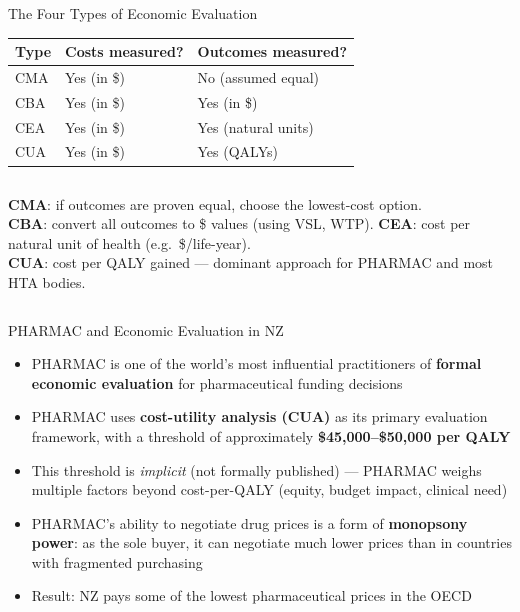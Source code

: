 \documentclass[aspectratio=169, 12pt]{beamer}
\begin{document}
\begin{frame}{The Four Types of Economic Evaluation}
  \begin{center}
    \small
    \begin{tabular}{@{}lll@{}}
      \toprule
      \textbf{Type} & \textbf{Costs measured?} & \textbf{Outcomes measured?} \\
      \midrule
      CMA & Yes (in \$) & No (assumed equal) \\
      CBA & Yes (in \$) & Yes (in \$) \\
      CEA & Yes (in \$) & Yes (natural units) \\
      CUA & Yes (in \$) & Yes (QALYs) \\
      \bottomrule
    \end{tabular}
  \end{center}
  \vspace{0.5em}
  \begin{columns}
      \small
      \textbf{CMA}: if outcomes are proven equal, choose the lowest-cost option.\\[0.4em]
      \textbf{CBA}: convert all outcomes to \$ values (using VSL, WTP).
      \small
      \textbf{CEA}: cost per natural unit of health (e.g.\ \$/life-year).\\[0.4em]
      \textbf{CUA}: cost per QALY gained --- dominant approach for PHARMAC and most HTA bodies.
  \end{columns}
\end{frame}

\begin{frame}{PHARMAC and Economic Evaluation in NZ}
  \small
  \begin{itemize}
    \item PHARMAC is one of the world's most influential practitioners of \textbf{formal
          economic evaluation} for pharmaceutical funding decisions
    \item PHARMAC uses \textbf{cost-utility analysis (CUA)} as its primary evaluation
          framework, with a threshold of approximately \textbf{\$45,000--\$50,000 per QALY}
    \item This threshold is \emph{implicit} (not formally published) --- PHARMAC weighs
          multiple factors beyond cost-per-QALY (equity, budget impact, clinical need)
    \item PHARMAC's ability to negotiate drug prices is a form of \textbf{monopsony power}:
          as the sole buyer, it can negotiate much lower prices than in countries with
          fragmented purchasing
    \item Result: NZ pays some of the lowest pharmaceutical prices in the OECD
  \end{itemize}
\end{frame}
\end{document}
